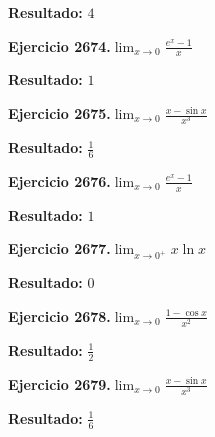 \documentclass[10pt,a4paper]{article}
\begin{document}
\begin{solbox}
\textbf{Resultado:} \(\displaystyle 4\)
\end{solbox}

\begin{ejbox}
\textbf{Ejercicio 2674.}\quad $\lim_{x\to 0} \frac{e^x-1}{x}$
\end{ejbox}

\begin{solbox}
\textbf{Resultado:} \(\displaystyle 1\)
\end{solbox}

\begin{ejbox}
\textbf{Ejercicio 2675.}\quad $\lim_{x\to 0} \frac{x-\sin x}{x^3}$
\end{ejbox}

\begin{solbox}
\textbf{Resultado:} \(\displaystyle \frac{1}{6}\)
\end{solbox}

\newpage
\begin{ejbox}
\textbf{Ejercicio 2676.}\quad $\lim_{x\to 0} \frac{e^x-1}{x}$
\end{ejbox}

\begin{solbox}
\textbf{Resultado:} \(\displaystyle 1\)
\end{solbox}

\begin{ejbox}
\textbf{Ejercicio 2677.}\quad $\lim_{x\to 0^+} x\ln x$
\end{ejbox}

\begin{solbox}
\textbf{Resultado:} \(\displaystyle 0\)
\end{solbox}

\begin{ejbox}
\textbf{Ejercicio 2678.}\quad $\lim_{x\to 0} \frac{1-\cos x}{x^2}$
\end{ejbox}

\begin{solbox}
\textbf{Resultado:} \(\displaystyle \frac{1}{2}\)
\end{solbox}

\newpage
\begin{ejbox}
\textbf{Ejercicio 2679.}\quad $\lim_{x\to 0} \frac{x-\sin x}{x^3}$
\end{ejbox}

\begin{solbox}
\textbf{Resultado:} \(\displaystyle \frac{1}{6}\)
\end{solbox}
\end{document}
